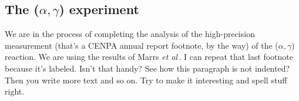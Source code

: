 \subsection{The (\boldmath $\alpha , \gamma $\unboldmath) experiment \label{articlelabel} }
%
%
%


\noindent     %
We are in the process of completing the analysis of the 
high-precision measurement (that's a CENPA annual report footnote, by the way)
of the ($\alpha , \gamma$)
reaction.   We are using the results of Marrs {\it et al}\,. %
I can repeat that last footnote because it's labeled. Isn't that handy? See how this paragraph is not indented? Then you write more text and so on. Try to make it interesting and spell stuff right.

